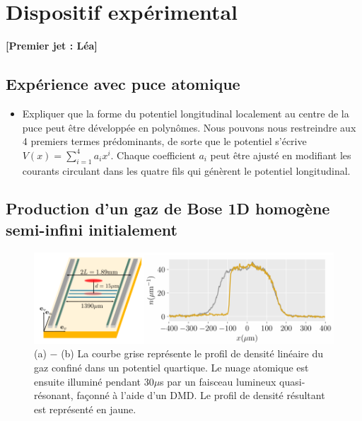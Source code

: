 \documentclass[submission, Phys]{SciPost}
\begin{document}
{\color{blue}
\section*{Dispositif expérimental}
{\bf [Premier jet : Léa]}
\subsection*{Expérience avec puce atomique}
\begin{itemize}
    \item Expliquer que la forme du potentiel longitudinal localement au centre de la puce peut être développée en polynômes. Nous pouvons nous restreindre aux 4 premiers termes prédominants, de sorte que le potentiel s'écrive $V(x) = \sum_{i=1}^{4} a_i x^i$. Chaque coefficient $a_i$ peut être ajusté en modifiant les courants circulant dans les quatre fils qui génèrent le potentiel longitudinal.
\end{itemize}

\subsection*{Production d'un gaz de Bose 1D homogène semi-infini initialement}

\begin{figure}[!htb]
    \centering
    \includegraphics[width=1.0\linewidth]{Figures/Atom_chip.PNG}
    \caption{(a) $-$ (b) La courbe grise représente le profil de densité linéaire du gaz confiné dans un potentiel quartique. Le nuage atomique est ensuite illuminé pendant $30 \mu$s par un faisceau lumineux quasi-résonant, façonné à l'aide d'un DMD. Le profil de densité résultant est représenté en jaune.}
    \label{fig:enter-label}
\end{figure}

}
\end{document}
